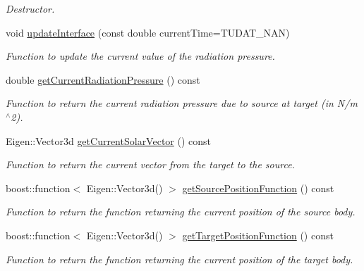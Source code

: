 \begin{DoxyCompactItemize}
\begin{DoxyCompactList}\small\item\em Destructor. \end{DoxyCompactList}\item 
void \hyperlink{classtudat_1_1electro__magnetism_1_1RadiationPressureInterface_a3a48081c956952226fe91447b405a993}{update\+Interface} (const double current\+Time=T\+U\+D\+A\+T\+\_\+\+N\+AN)
\begin{DoxyCompactList}\small\item\em Function to update the current value of the radiation pressure. \end{DoxyCompactList}\item 
double \hyperlink{classtudat_1_1electro__magnetism_1_1RadiationPressureInterface_a5771c2ca31eccf97d38c11b6b2019f3c}{get\+Current\+Radiation\+Pressure} () const 
\begin{DoxyCompactList}\small\item\em Function to return the current radiation pressure due to source at target (in N/m$^\wedge$2). \end{DoxyCompactList}\item 
Eigen\+::\+Vector3d \hyperlink{classtudat_1_1electro__magnetism_1_1RadiationPressureInterface_a72463a39729493b51bd9670aed832812}{get\+Current\+Solar\+Vector} () const 
\begin{DoxyCompactList}\small\item\em Function to return the current vector from the target to the source. \end{DoxyCompactList}\item 
boost\+::function$<$ Eigen\+::\+Vector3d() $>$ \hyperlink{classtudat_1_1electro__magnetism_1_1RadiationPressureInterface_a951e3badd78f7714be9d8c004341cd38}{get\+Source\+Position\+Function} () const 
\begin{DoxyCompactList}\small\item\em Function to return the function returning the current position of the source body. \end{DoxyCompactList}\item 
boost\+::function$<$ Eigen\+::\+Vector3d() $>$ \hyperlink{classtudat_1_1electro__magnetism_1_1RadiationPressureInterface_a9e423805f25996b655563ad4c4aaa27b}{get\+Target\+Position\+Function} () const 
\begin{DoxyCompactList}\small\item\em Function to return the function returning the current position of the target body. \end{DoxyCompactList}\item 

\end{DoxyCompactItemize}

